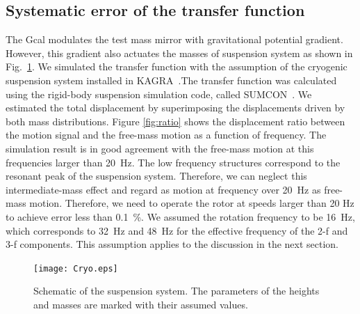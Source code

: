 \documentclass[%
 reprint,
superscriptaddress,
 amsmath,amssymb,
 aps,
]{revtex4-1}
\begin{document}
\subsection{Systematic error of the transfer function}
The Gcal modulates the test mass mirror with gravitational potential gradient. However, this gradient also actuates the masses of suspension system as shown in Fig.~\ref{fig:cryo}. We simulated the transfer function with the assumption of the cryogenic suspension system installed in KAGRA~\cite{0264-9381-34-22-225001}.The transfer function was calculated using the rigid-body suspension simulation code, called SUMCON~\cite{SUMCON}. We estimated the total displacement by superimposing the displacements driven by both mass distributions. Figure \ref{fig:ratio} shows the displacement ratio between the motion signal and the free-mass motion as a function of frequency. The simulation result is in good agreement with the free-mass motion at this frequencies larger than 20~Hz. The low frequency structures correspond to the resonant peak of the suspension system. Therefore, we can neglect this intermediate-mass effect and regard as motion at frequency over 20~Hz as free-mass motion. 
Therefore, we need to operate the rotor at speeds larger than 20 Hz to achieve error less than 0.1~\%.
We assumed the rotation frequency to be 16~Hz, which corresponds to 32~Hz and 48~Hz for the effective frequency of the 2-f and 3-f components. 
This assumption applies to the discussion in the next section.

\begin{figure}
\begin{center}
\texttt{[image: Cryo.eps]}
\caption{Schematic of the suspension system. The parameters of the heights and masses are marked with their assumed values. }
\label{fig:cryo}
\end{center}
\end{figure}
\end{document}

